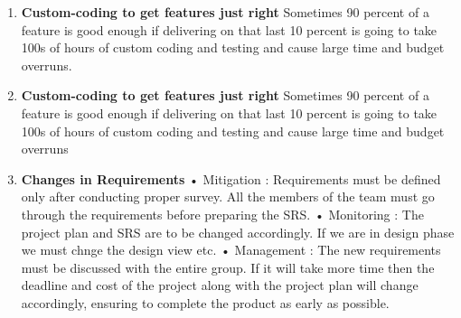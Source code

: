 \documentclass[12pt]{article}
\begin{document}
\begin{enumerate}
\item 
\textbf{Custom-coding to get features just right} Sometimes 90 percent of
a feature is good enough if delivering on that last 10 percent is going to
take 100s of hours of custom coding and testing and cause large time and
budget overruns.
\item 
\textbf{Custom-coding to get features just right} Sometimes 90 percent of
a feature is good enough if delivering on that last 10 percent is going to
take 100s of hours of custom coding and testing and cause large time and
budget overruns
\item 
\textbf{Changes in Requirements}
• Mitigation : Requirements must be defined only after conducting
proper survey. All the members of the team must go through the
requirements before preparing the SRS.
• Monitoring : The project plan and SRS are to be changed accordingly.
If we are in design phase we must chnge the design view etc.
• Management : The new requirements must be discussed with the
entire group. If it will take more time then the deadline and cost of the
project along with the project plan will change accordingly, ensuring
to complete the product as early as possible.
\end{enumerate}
\end{document}
